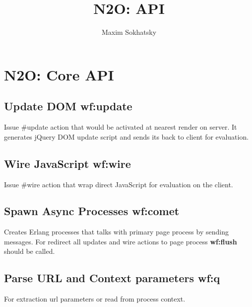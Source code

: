 \documentclass[11pt]{article}
\begin{document}
\title{N2O: API}
\author{Maxim Sokhatsky}

\paragraph{}
\section*{N2O: Core API}

\subsection*{Update DOM \bf{wf:update}}
Issue #update{} action that would be activated at nearest render on server.
It generates jQuery DOM update script and sends its back to client for evaluation.

\subsection*{Wire JavaScript \bf{wf:wire}}
Issue #wire{} action that wrap direct JavaScript for evaluation on the client.

\subsection*{Spawn Async Processes \bf{wf:comet}}
Creates Erlang processes that talks with primary page process by sending messages.
For redirect all updates and wire actions to page process {\bf wf:flush} should be called.

\subsection*{Parse URL and Context parameters \bf{wf:q}}
For extraction url parameters or read from process context.







\end{document}
